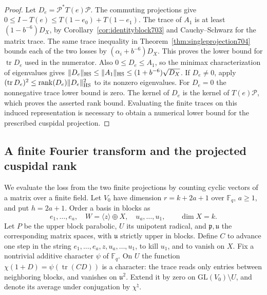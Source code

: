 \documentclass[a4paper,11pt]{article}
\theoremstyle{definition}
\theoremstyle{remark}
\numberwithin{equation}{section}
\begin{document}
\begin{proof}
Let \(D_e=\mathcal P^*T(e)\mathcal P\). The commuting projections
give \(0\le I-T(e)\le T(1-e_0)+T(1-e_1)\). The trace of
\(A_1\) is at least \((1-b^{-6})D_X\), by
Corollary~\ref{cor:identityblock703} and Cauchy--Schwarz for
the matrix trace. The same trace inequality in
Theorem~\ref{thm:singleprojection704} bounds each of the two
losses by \((\alpha_i+b^{-6})D_X\). This proves the lower
bound for \(\operatorname{tr}D_e\) used in the numerator.
Also \(0\le D_e\le A_1\), so the minimax characterization of
eigenvalues gives \(\|D_e\|_{\rm HS}\le\|A_1\|_{\rm HS}
\le (1+b^{-6})\sqrt{D_X}\). If \(D_e\ne0\), apply
\((\operatorname{tr}D_e)^2\le
\operatorname{rank}(D_e)\|D_e\|_{\rm HS}^2\) to its nonzero
eigenvalues. For \(D_e=0\) the nonnegative trace lower bound
is zero. The kernel of \(D_e\) is the kernel of \(T(e)\mathcal P\),
which proves the asserted rank bound. Evaluating the finite
traces on this induced representation is necessary to obtain
a numerical lower bound for the prescribed cuspidal projection.
\end{proof}


\subsection{A finite Fourier transform and the projected cuspidal rank}
\label{sec:finitefourier705}

We evaluate the loss from the two finite projections by
counting cyclic vectors of a matrix over a finite field.
Let \(V_0\) have dimension \(r=k+2a+1\) over \(\mathbb F_q\),
\(a\ge1\), and put \(h=2a+1\). Order a basis in blocks as
\[
       e_1,\ldots,e_a,\quad W=\langle z\rangle\oplus X,\quad
       u_a,\ldots,u_1,\qquad \dim X=k .
\]
Let \(P\) be the upper block parabolic, \(U\) its unipotent
radical, and \(\mathfrak p,\mathfrak u\) the corresponding
matrix spaces, with \(\mathfrak u\) strictly upper in blocks.
Define \(C\) to advance one step in the string
\(e_1,\ldots,e_a,z,u_a,\ldots,u_1\), to kill \(u_1\),
and to vanish on \(X\). Fix a nontrivial additive character
\(\psi\) of \(\mathbb F_q\). On \(U\) the function
\(\chi(1+D)=\psi(\operatorname{tr}(CD))\) is a character:
the trace reads only entries between neighboring blocks,
and vanishes on \(\mathfrak u^2\). Extend it by zero on
\(\mathrm{GL}(V_0)\setminus U\), and denote its average under
conjugation by \(\chi^\natural\).
\end{document}

